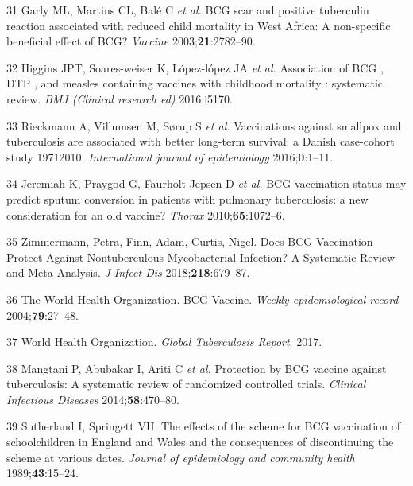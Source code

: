 \documentclass[11pt,twoside]{bristolthesis}
\begin{document}
  \leavevmode\hypertarget{ref-Garly2003}{}%
  31 Garly ML, Martins CL, Balé C \emph{et al.} BCG scar and positive tuberculin reaction associated with reduced child mortality in West Africa: A non-specific beneficial effect of BCG? \emph{Vaccine} 2003;\textbf{21}:2782--90.
  
  \leavevmode\hypertarget{ref-Higgins}{}%
  32 Higgins JPT, Soares-weiser K, López-lópez JA \emph{et al.} Association of BCG , DTP , and measles containing vaccines with childhood mortality : systematic review. \emph{BMJ (Clinical research ed)} 2016;i5170.
  
  \leavevmode\hypertarget{ref-Rieckmann2016}{}%
  33 Rieckmann A, Villumsen M, Sørup S \emph{et al.} Vaccinations against smallpox and tuberculosis are associated with better long-term survival: a Danish case-cohort study 19712010. \emph{International journal of epidemiology} 2016;\textbf{0}:1--11.
  
  \leavevmode\hypertarget{ref-Jeremiah2010}{}%
  34 Jeremiah K, Praygod G, Faurholt-Jepsen D \emph{et al.} BCG vaccination status may predict sputum conversion in patients with pulmonary tuberculosis: a new consideration for an old vaccine? \emph{Thorax} 2010;\textbf{65}:1072--6.
  
  \leavevmode\hypertarget{ref-Zimmermann:2018io}{}%
  35 Zimmermann, Petra, Finn, Adam, Curtis, Nigel. Does BCG Vaccination Protect Against Nontuberculous Mycobacterial Infection? A Systematic Review and Meta-Analysis. \emph{J Infect Dis} 2018;\textbf{218}:679--87.
  
  \leavevmode\hypertarget{ref-The2004}{}%
  36 The World Health Organization. BCG Vaccine. \emph{Weekly epidemiological record} 2004;\textbf{79}:27--48.
  
  \leavevmode\hypertarget{ref-WHO2017}{}%
  37 World Health Organization. \emph{Global Tuberculosis Report}. 2017.
  
  \leavevmode\hypertarget{ref-Mangtani2014}{}%
  38 Mangtani P, Abubakar I, Ariti C \emph{et al.} Protection by BCG vaccine against tuberculosis: A systematic review of randomized controlled trials. \emph{Clinical Infectious Diseases} 2014;\textbf{58}:470--80.
  
  \leavevmode\hypertarget{ref-Sutherland1989}{}%
  39 Sutherland I, Springett VH. The effects of the scheme for BCG vaccination of schoolchildren in England and Wales and the consequences of discontinuing the scheme at various dates. \emph{Journal of epidemiology and community health} 1989;\textbf{43}:15--24.
  
\end{document}
